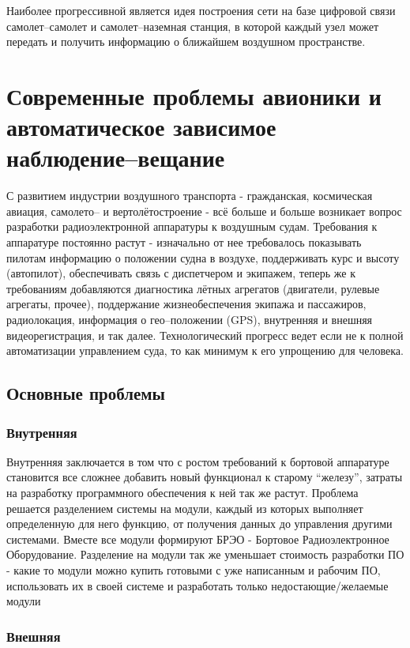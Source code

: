 \documentclass[a4paper,12pt]{report} %
\begin{document}
Наиболее прогрессивной является идея построения сети на базе цифровой связи
самолет--самолет и самолет--наземная станция, в которой каждый узел может
передать и получить информацию о ближайшем воздушном пространстве.
\newpage
\chapter{Современные проблемы авионики и автоматическое зависимое
  наблюдение--вещание} %

С развитием индустрии воздушного транспорта - гражданская, космическая авиация,
самолето-- и вертолётостроение - всё больше и больше возникает вопрос разработки
радиоэлектронной аппаратуры к воздушным судам. Требования к аппаратуре постоянно
растут - изначально от нее требовалось показывать пилотам информацию о положении
судна в воздухе, поддерживать курс и высоту (автопилот), обеспечивать связь с
диспетчером и экипажем, теперь же к требованиям добавляются диагностика лётных
агрегатов (двигатели, рулевые агрегаты, прочее), поддержание жизнеобеспечения
экипажа и пассажиров, радиолокация, информация о гео--положении
(GPS), внутренняя и внешняя видеорегистрация, и так далее. Технологический
прогресс ведет если не к полной автоматизации управлением суда, то как минимум к
его упрощению для человека.

\section{Основные проблемы}

\subsection{Внутренняя}

Внутренняя заключается в том что с ростом требований к бортовой аппаратуре
становится все сложнее добавить новый функционал к старому ``железу'', затраты
на разработку программного обеспечения к ней так же растут. Проблема решается
разделением системы на модули, каждый из которых выполняет определенную для него
функцию, от получения данных до управления другими системами. Вместе все модули
формируют БРЭО - Бортовое Радиоэлектронное Оборудование. Разделение на модули
так же уменьшает стоимость разработки ПО - какие то модули можно купить готовыми
с уже написанным и рабочим ПО, использовать их в своей системе и разработать
только недостающие/желаемые модули

\subsection{Внешняя}
\end{document}
